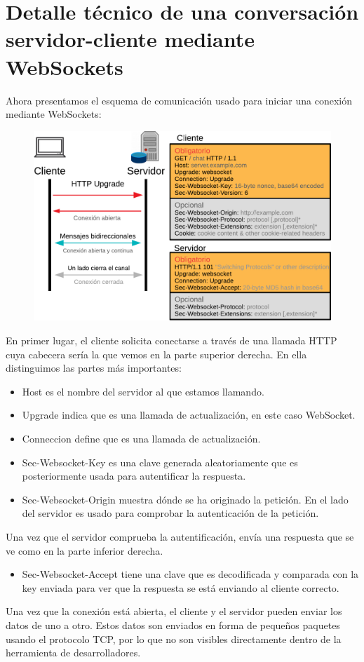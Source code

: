 \documentclass[12pt,a4paper]{article}
\begin{document}
\section{Detalle técnico de una conversación servidor-cliente mediante WebSockets}


Ahora presentamos el esquema de comunicación usado para iniciar una conexión mediante WebSockets:

\begin{figure}[H]
\centering
\includegraphics[scale=0.8]{imagenes/diagrama.pdf}
\end{figure}

En primer lugar, el cliente solicita conectarse a través de una llamada HTTP cuya cabecera sería la que vemos en la parte superior derecha. En ella distinguimos las partes más importantes:
\begin{itemize}
\item Host es el nombre del servidor al que estamos llamando.
\item Upgrade indica que es una llamada de actualización, en este caso WebSocket.
\item Conneccion define que es una llamada de actualización.
\item Sec-Websocket-Key es una clave generada aleatoriamente que es posteriormente usada para autentificar la respuesta.
\item Sec-Websocket-Origin muestra dónde se ha originado la petición. En el lado del servidor es usado para comprobar la autenticación de la petición.
\end{itemize}
Una vez que el servidor comprueba la autentificación, envía una respuesta que se ve como en la parte inferior derecha.
\begin{itemize}
\item Sec-Websocket-Accept tiene una clave que es decodificada y comparada con la key enviada para ver que la respuesta se está enviando al cliente correcto.
\end{itemize}
Una vez que la conexión está abierta, el cliente y el servidor pueden enviar los datos de uno a otro. Estos datos son enviados en forma de pequeños paquetes usando el protocolo TCP, por lo que no son visibles directamente dentro de la herramienta de desarrolladores.
\end{document}
